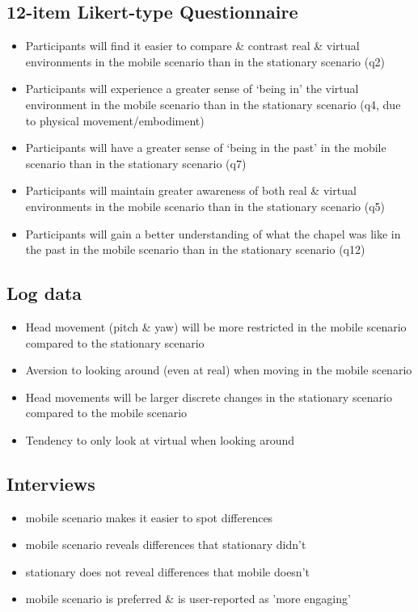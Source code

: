 \subsection{12-item Likert-type Questionnaire}
\begin{itemize}
	\item Participants will find it easier to compare \& contrast real \& virtual environments in the mobile scenario than in the stationary scenario (q2)
	\item Participants will experience a greater  sense of `being in' the virtual environment in the mobile scenario than in the stationary scenario (q4, due to physical movement/embodiment)
	\item Participants will have a greater sense of `being in the past' in the mobile scenario than in the stationary scenario (q7)
	\item Participants will maintain greater awareness of both real \& virtual environments in the mobile scenario than in the stationary scenario (q5)
	\item Participants will gain a better understanding of what the chapel was like in the past in the mobile scenario than in the stationary scenario (q12)
\end{itemize}

\subsection{Log data}
\begin{itemize}
	\item Head movement (pitch \& yaw) will be more restricted in the mobile scenario compared to the stationary scenario
	\item Aversion to looking around (even at real) when moving in the mobile scenario
	\item Head movements will be larger discrete changes in the stationary scenario compared to the mobile scenario
	\item Tendency to only look at virtual when looking around
\end{itemize}

\subsection{Interviews}
\begin{itemize}
	\item mobile scenario makes it easier to spot differences
	\item mobile scenario reveals differences that stationary didn't
	\item stationary does not reveal differences that mobile doesn't
	\item mobile scenario is preferred \& is user-reported as 'more engaging'
\end{itemize}

